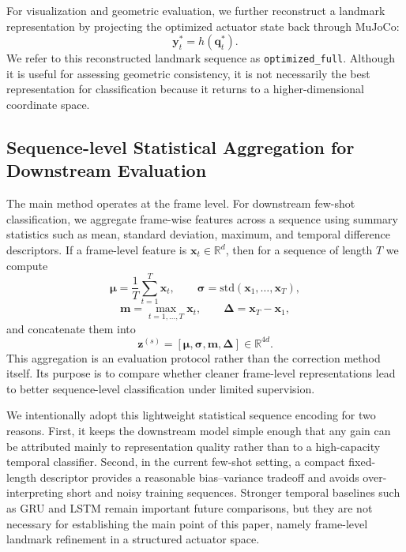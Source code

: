 \documentclass[11pt]{article}
\begin{document}
For visualization and geometric evaluation, we further reconstruct a landmark representation by projecting the optimized actuator state back through MuJoCo:
\[
\mathbf{y}_t^* = h(\mathbf{q}_t^*).
\]
We refer to this reconstructed landmark sequence as \texttt{optimized\_full}. Although it is useful for assessing geometric consistency, it is not necessarily the best representation for classification because it returns to a higher-dimensional coordinate space.

\subsection{Sequence-level Statistical Aggregation for Downstream Evaluation}
The main method operates at the frame level. For downstream few-shot classification, we aggregate frame-wise features across a sequence using summary statistics such as mean, standard deviation, maximum, and temporal difference descriptors. If a frame-level feature is $\mathbf{x}_t \in \mathbb{R}^{d}$, then for a sequence of length $T$ we compute
\[
\boldsymbol{\mu} = \frac{1}{T}\sum_{t=1}^{T}\mathbf{x}_t,\qquad
\boldsymbol{\sigma} = \mathrm{std}(\mathbf{x}_1,\dots,\mathbf{x}_T),
\]
\[
\mathbf{m} = \max_{t=1,\dots,T}\mathbf{x}_t,\qquad
\boldsymbol{\Delta} = \mathbf{x}_T - \mathbf{x}_1,
\]
and concatenate them into
\[
\mathbf{z}^{(s)} = [\boldsymbol{\mu}, \boldsymbol{\sigma}, \mathbf{m}, \boldsymbol{\Delta}] \in \mathbb{R}^{4d}.
\]
This aggregation is an evaluation protocol rather than the correction method itself. Its purpose is to compare whether cleaner frame-level representations lead to better sequence-level classification under limited supervision.

We intentionally adopt this lightweight statistical sequence encoding for two reasons. First, it keeps the downstream model simple enough that any gain can be attributed mainly to representation quality rather than to a high-capacity temporal classifier. Second, in the current few-shot setting, a compact fixed-length descriptor provides a reasonable bias--variance tradeoff and avoids over-interpreting short and noisy training sequences. Stronger temporal baselines such as GRU and LSTM remain important future comparisons, but they are not necessary for establishing the main point of this paper, namely frame-level landmark refinement in a structured actuator space.
\end{document}
